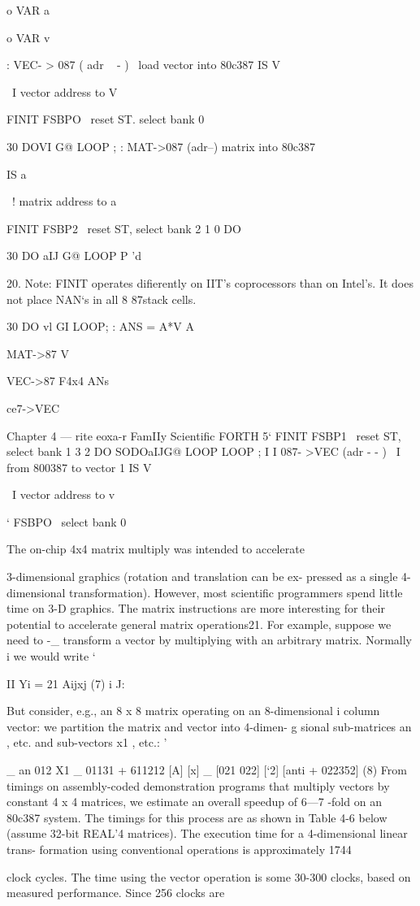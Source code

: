 o VAR a{{ o VAR v{

: VEC- > 087 ( adr ~ - ) \ load vector into 80c387
IS V{ \ I vector address to V{
FINIT FSBPO \ reset ST. select bank 0

30 DOV{I} G@ LOOP ;
: MAT->087 (adr--) \Ioad matrix into 80c387

IS a{{ \ ! matrix address to a{{
FINIT FSBP2 \ reset ST, select bank 2
1 0 DO

30 DO a{{IJ}} G@ LOOP
P \cont'd

 

20. Note: FINIT operates diﬁerently on IIT’s coprocessors than on Intel’s. It does not place NAN‘s
in all 8 87stack cells.

30 DO v{l} GI LOOP;
\example: ANS = A*V
A{{ MAT->87 V{ VEC->87 F4x4 ANs{ce7->VEC

Chapter 4 — rite eoxa-r FamIIy Scientiﬁc FORTH 5‘
FINIT FSBP1 \ reset ST, select bank 1
3 2 DO
SODOa{{IJ}}G@ LOOP
LOOP ; I
I
087- >VEC (adr - - ) \ I from 800387 to vector 1
IS V{ \ I vector address to v{ ‘
FSBPO \ select bank 0 %

 

The on-chip 4x4 matrix multiply was intended to accelerate

3-dimensional graphics (rotation and translation can be ex-
pressed as a single 4-dimensional transformation). However, most
scientiﬁc programmers spend little time on 3-D graphics. The matrix
instructions are more interesting for their potential to accelerate
general matrix operations21. For example, suppose we need to -_
transform a vector by multiplying with an arbitrary matrix. Normally i
we would write ‘

   

II
Yi = 21 Aijxj (7) i
J:

But consider, e.g., an 8 x 8 matrix operating on an 8-dimensional i
column vector: we partition the matrix and vector into 4-dimen- g
sional sub-matrices an , etc. and sub-vectors x1 , etc.: '

_ an 012 X1 _ 01131 + 611212
[A] [x] _ [021 022] [‘2] [anti + 022352] (8)
From timings on assembly-coded demonstration programs that
multiply vectors by constant 4 x 4 matrices, we estimate an overall
speedup of 6—7 -fold on an 80c387 system. The timings for this
process are as shown in Table 4-6 below (assume 32-bit REAL'4
matrices). The execution time for a 4-dimensional linear trans-
formation using conventional operations is approximately 1744

clock cycles. The time using the vector operation is some 30-300
clocks, based on measured performance. Since 256 clocks are

}}}}}}}}}}}}}}}
